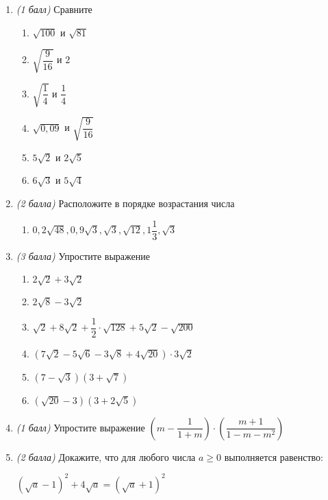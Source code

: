 \documentclass[12pt, a4paper]{article}
\begin{document}
\begin{enumerate}
		
		\item \textit{(1 балл)} Сравните 
		\begin{multicols}{2}
			\begin{enumerate}[label=\asbuk*)]
				\item $\sqrt{100}$ и $\sqrt{81}$
				\item $\sqrt{\dfrac{9}{16}}$ и $2$
				\item $\sqrt{\dfrac{1}{4}}$ и $\dfrac{1}{4}$
				\item $\sqrt{0,09}$ и $\sqrt{\dfrac{9}{16}}$
				\item $5\sqrt{2}$ и $2\sqrt{5}$
				\item $6\sqrt{3}$ и $5\sqrt{4}$
			\end{enumerate}
		\end{multicols}
		\item \textit{(2 балла)} Расположите в порядке возрастания числа
		\begin{enumerate}[label=\asbuk*)]
			\item $0,2\sqrt{48}, 0,9\sqrt{3}, \sqrt{3}, \sqrt{12}, 1\dfrac{1}{3}, \sqrt{3}$
		\end{enumerate}
		\item \textit{(3 балла)} Упростите выражение
		\begin{multicols}{2}
			\begin{enumerate}[label=\asbuk*)]
				\item $2\sqrt{2}+3\sqrt{2}$
				\item $2\sqrt{8}-3\sqrt{2}$
				\item $\sqrt{2}+8\sqrt{2}+\dfrac{1}{2}\cdot \sqrt{128}+5\sqrt{2}-\sqrt{200}$
				\item $\left( 7\sqrt{2}-5\sqrt{6}-3\sqrt{8}+4\sqrt{20}\right) \cdot 3\sqrt{2} $
				\item $\left( 7-\sqrt{3}\right) \left( 3+\sqrt{7}\right)  $
				\item $\left( \sqrt{20}-3\right)\left( 3+2\sqrt{5}\right)  $
			\end{enumerate}
		\end{multicols}
		\item \textit{(1 балл)} Упростите выражение
		$\left(m - \dfrac{1}{1+m} \right) \cdot \left( \dfrac{m+1}{1-m-m^2}\right)  $
		\item \textit{(2 балла)} Докажите, что для любого числа $a \geq 0$ выполняется равенство:
		
		$(\sqrt{a}-1)^2+4\sqrt{a}=(\sqrt{a}+1)^2$
	\end{enumerate}
\end{document}
